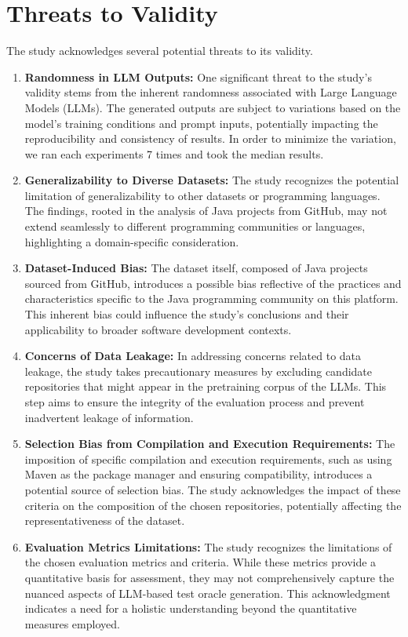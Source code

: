 \section{Threats to Validity}
\label{sec:t2v}
\vspace{0.2 cm}

The study acknowledges several potential threats to its validity.

\begin{enumerate}
    \item \textbf{Randomness in LLM Outputs:} One significant threat to the study's validity stems from the inherent randomness associated with Large Language Models (LLMs). The generated outputs are subject to variations based on the model's training conditions and prompt inputs, potentially impacting the reproducibility and consistency of results. In order to minimize the variation, we ran each experiments 7 times and took the median results.

    \item \textbf{Generalizability to Diverse Datasets:} The study recognizes the potential limitation of generalizability to other datasets or programming languages. The findings, rooted in the analysis of Java projects from GitHub, may not extend seamlessly to different programming communities or languages, highlighting a domain-specific consideration.

    \item \textbf{Dataset-Induced Bias:} The dataset itself, composed of Java projects sourced from GitHub, introduces a possible bias reflective of the practices and characteristics specific to the Java programming community on this platform. This inherent bias could influence the study's conclusions and their applicability to broader software development contexts.

    \item \textbf{Concerns of Data Leakage:} In addressing concerns related to data leakage, the study takes precautionary measures by excluding candidate repositories that might appear in the pretraining corpus of the LLMs. This step aims to ensure the integrity of the evaluation process and prevent inadvertent leakage of information.

    \item \textbf{Selection Bias from Compilation and Execution Requirements:} The imposition of specific compilation and execution requirements, such as using Maven as the package manager and ensuring compatibility, introduces a potential source of selection bias. The study acknowledges the impact of these criteria on the composition of the chosen repositories, potentially affecting the representativeness of the dataset.

    \item \textbf{Evaluation Metrics Limitations:} The study recognizes the limitations of the chosen evaluation metrics and criteria. While these metrics provide a quantitative basis for assessment, they may not comprehensively capture the nuanced aspects of LLM-based test oracle generation. This acknowledgment indicates a need for a holistic understanding beyond the quantitative measures employed.
\end{enumerate}

